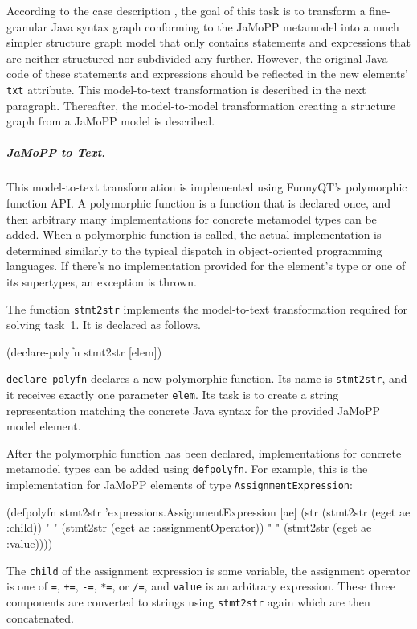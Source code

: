 \documentclass[submission]{eptcs}
\begin{document}
According to the case description \cite{flowgraphcasedesc}, the goal of this
task is to transform a fine-granular Java syntax graph conforming to the JaMoPP
metamodel \cite{jamopp09} into a much simpler structure graph model that only
contains statements and expressions that are neither structured nor subdivided
any further.  However, the original Java code of these statements and
expressions should be reflected in the new elements' \verb|txt| attribute.
This model-to-text transformation is described in the next paragraph.
Thereafter, the model-to-model transformation creating a structure graph from a
JaMoPP model is described.


\subparagraph{JaMoPP to Text.}
\label{sec:jamopp-text}

This model-to-text transformation is implemented using FunnyQT's polymorphic
function API.  A polymorphic function is a function that is declared once, and
then arbitrary many implementations for concrete metamodel types can be added.
When a polymorphic function is called, the actual implementation is determined
similarly to the typical dispatch in object-oriented programming languages.  If
there's no implementation provided for the element's type or one of its
supertypes, an exception is thrown.

The function \verb|stmt2str| implements the model-to-text transformation
required for solving task~1.  It is declared as follows.

\begin{clojurecode}
(declare-polyfn stmt2str [elem])
\end{clojurecode}

\verb|declare-polyfn| declares a new polymorphic function.  Its name is
\verb|stmt2str|, and it receives exactly one parameter \verb|elem|.  Its task
is to create a string representation matching the concrete Java syntax for the
provided JaMoPP model element.

After the polymorphic function has been declared, implementations for concrete
metamodel types can be added using \verb|defpolyfn|.  For example, this is the
implementation for JaMoPP elements of type \verb|AssignmentExpression|:

\begin{clojurecode}
(defpolyfn stmt2str 'expressions.AssignmentExpression [ae]
  (str (stmt2str (eget ae :child)) " "
       (stmt2str (eget ae :assignmentOperator)) " "
       (stmt2str (eget ae :value))))
\end{clojurecode}

The \verb|child| of the assignment expression is some variable, the assignment
operator is one of \verb|=|, \verb|+=|, \verb|-=|, \verb|*=|, or \verb|/=|, and
\verb|value| is an arbitrary expression.  These three components are converted
to strings using \verb|stmt2str| again which are then concatenated.
\end{document}
